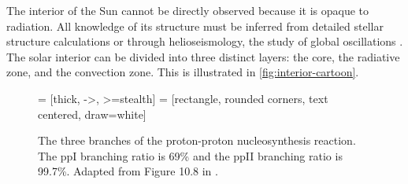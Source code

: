 The interior of the Sun cannot be directly observed because it is opaque to radiation. All knowledge of its structure must be inferred from detailed stellar structure calculations or through helioseismology, the study of global oscillations \citep{priest_magnetohydrodynamics_2014}. The solar interior can be divided into three distinct layers: the core, the radiative zone, and the convection zone. This is illustrated in \autoref{fig:interior-cartoon}.

\begin{figure}
     = [thick, ->, >=stealth]
     = [rectangle, rounded corners, text centered, draw=white]
    \centering
    \caption{The three branches of the proton-proton nucleosynthesis reaction. The ppI branching ratio is 69\% and the ppII branching ratio is 99.7\%. Adapted from Figure 10.8 in \citet{carroll_introduction_2007}.}
    \label{fig:pp-chain}
\end{figure}

